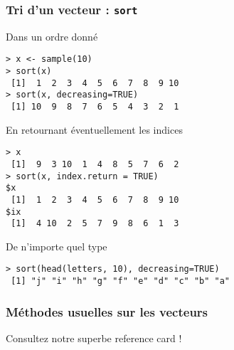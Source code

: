 \documentclass[10pt]{beamer}
\begin{document}

\begin{frame}[fragile]
  \frametitle{Tri d'un vecteur : \texttt{sort}}
  \begin{block}{Dans un ordre donné}
\begin{lstlisting}[style=block]
> x <- sample(10)
> sort(x)
 [1]  1  2  3  4  5  6  7  8  9 10
> sort(x, decreasing=TRUE)
 [1] 10  9  8  7  6  5  4  3  2  1
\end{lstlisting}    
\end{block}

\begin{block}{En retournant éventuellement les indices}
\begin{lstlisting}[style=block]
> x
 [1]  9  3 10  1  4  8  5  7  6  2  
> sort(x, index.return = TRUE)
$x
 [1]  1  2  3  4  5  6  7  8  9 10
$ix
 [1]  4 10  2  5  7  9  8  6  1  3
\end{lstlisting}    
\end{block}

\begin{block}{De n'importe quel type}
\begin{lstlisting}[style=block]
> sort(head(letters, 10), decreasing=TRUE)
 [1] "j" "i" "h" "g" "f" "e" "d" "c" "b" "a"  
\end{lstlisting}    
\end{block}


\end{frame}




\begin{frame}[fragile]
  \frametitle{Méthodes usuelles sur les vecteurs}
  \begin{center}
    Consultez notre superbe \alert{reference card} !
  \end{center}
\end{frame}
\end{document}
